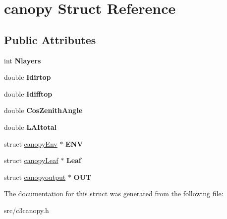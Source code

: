 \hypertarget{structcanopy}{\section{canopy Struct Reference}
\label{structcanopy}
}
\subsection*{Public Attributes}
\begin{DoxyCompactItemize}
\item 
\hypertarget{structcanopy_aee7046b22f6d5a9bb5462bcd62955197}{int {\bfseries Nlayers}}\label{structcanopy_aee7046b22f6d5a9bb5462bcd62955197}

\item 
\hypertarget{structcanopy_aae50b8a0e2bf7b5d7710ecb807be9203}{double {\bfseries Idirtop}}\label{structcanopy_aae50b8a0e2bf7b5d7710ecb807be9203}

\item 
\hypertarget{structcanopy_aa15305c88a0cfbfd4c4b2b5640ad223a}{double {\bfseries Idifftop}}\label{structcanopy_aa15305c88a0cfbfd4c4b2b5640ad223a}

\item 
\hypertarget{structcanopy_ade37ae120ca44bb0f16b26c9c3b08c09}{double {\bfseries Cos\-Zenith\-Angle}}\label{structcanopy_ade37ae120ca44bb0f16b26c9c3b08c09}

\item 
\hypertarget{structcanopy_ae3becf2b896555f19f6a3ab64a678fee}{double {\bfseries L\-A\-Itotal}}\label{structcanopy_ae3becf2b896555f19f6a3ab64a678fee}

\item 
\hypertarget{structcanopy_a299f71e5db83e619ba38649995645b77}{struct \hyperlink{structcanopy_env}{canopy\-Env} $\ast$ {\bfseries E\-N\-V}}\label{structcanopy_a299f71e5db83e619ba38649995645b77}

\item 
\hypertarget{structcanopy_af0b16998b89bc15c3d268f38161cf96c}{struct \hyperlink{structcanopy_leaf}{canopy\-Leaf} $\ast$ {\bfseries Leaf}}\label{structcanopy_af0b16998b89bc15c3d268f38161cf96c}

\item 
\hypertarget{structcanopy_abf0b63db16abf25d9ab7c1f994455b36}{struct \hyperlink{structcanopyoutput}{canopyoutput} $\ast$ {\bfseries O\-U\-T}}\label{structcanopy_abf0b63db16abf25d9ab7c1f994455b36}

\end{DoxyCompactItemize}


The documentation for this struct was generated from the following file\-:\begin{DoxyCompactItemize}
\item 
src/c3canopy.\-h\end{DoxyCompactItemize}
